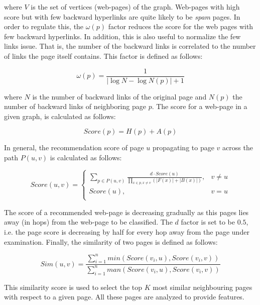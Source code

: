 \nointend where $V$ is the set of vertices (web-pages) of the graph. Web-pages with high score but with few backward hyperlinks are quite likely to be \textit{spam} pages. In order to regulate this, the $\omega(p)$ factor reduces the score for the web pages with few backward hyperlinks. In addition, this is also useful to normalize the few links issue. That is, the number of the backward links is correlated to the number of links the page itself contains. This factor is defined as follows:

\begin{equation}\label{eq:GenreSim_omega}
	\omega(p) = \frac{1}{|\log N - \log N(p) | + 1} 
\end{equation}

\nointend where $N$ is the number of backward links of the original page and $N(p)$ the number of backward links of neighboring page $p$. The score for a web-page in a given graph, is calculated as follows:

\begin{equation}\label{eq:GenreSim_Score}
	Score(p) = H(p) + A(p)
\end{equation}

In general, the recommendation score of page $u$ propagating to page $v$ across the path $P(u,v)$ is calculated as follows:

\begin{equation}\label{eq:GenreSim_Path}
	Score(u, v) =
      \begin{cases}
      	\sum_{p \in P(u, v)} \frac{d \cdot Score(u)}{\prod_{x \in p, x  \neq v} (|F(x)| +|B(x)|)}, & v \neq u \\
        Score(u), & v = u \\ 
       \end{cases}
\end{equation}

The score of a recommended web-page is decreasing gradually as this pages lies away (in hops) from the web-page to be classified. The $d$ factor is set to be $0.5$, i.e. the page score is decreasing by half for every hop away from the page under examination. Finally, the similarity of two pages is defined as follows:

\begin{equation}\label{eq:GenreSim_Selection_Score}
	Sim(u, v) = \frac{\sum_{i=1}^{n} min(Score(v_{i}, u), Score(v_{i}, v))}{\sum_{i=1}^{n} man(Score(v_{i}, u), Score(v_{i}, v))}
\end{equation}

This similarity score is used to select the top $K$ most similar neighbouring pages with respect to a given page. All these pages are analyzed to provide features. 

